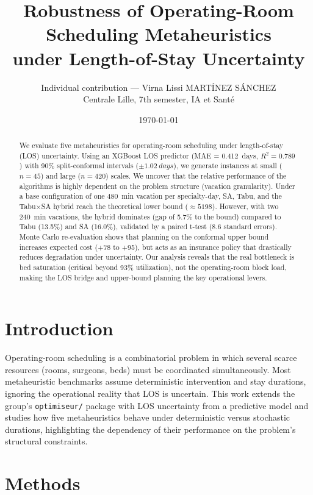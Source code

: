 \documentclass[11pt,a4paper]{article}
\title{Robustness of Operating-Room Scheduling Metaheuristics\\under Length-of-Stay Uncertainty}
\author{Individual contribution --- Virna Lissi MARTÍNEZ SÁNCHEZ\\Centrale Lille, 7th semester, IA et Santé}
\date{\today}
\begin{document}
\maketitle

\begin{abstract}
\noindent
We evaluate five metaheuristics for operating-room scheduling under length-of-stay (LOS) uncertainty. Using an XGBoost LOS predictor (MAE = \SI{0.412}{days}, \(R^2 = 0.789\)) with 90\% split-conformal intervals (\(\pm \SI{1.02}{days}\)), we generate instances at small (\(n=45\)) and large (\(n=420\)) scales. We uncover that the relative performance of the algorithms is highly dependent on the problem structure (vacation granularity). Under a base configuration of one \SI{480}{min} vacation per specialty-day, SA, Tabu, and the Tabu\(\times\)SA hybrid reach the theoretical lower bound (\(\approx 5198\)). However, with two \SI{240}{min} vacations, the hybrid dominates (gap of 5.7\% to the bound) compared to Tabu (13.5\%) and SA (16.0\%), validated by a paired t-test (8.6 standard errors). Monte Carlo re-evaluation shows that planning on the conformal upper bound increases expected cost (+78 to +95), but acts as an insurance policy that drastically reduces degradation under uncertainty. Our analysis reveals that the real bottleneck is bed saturation (critical beyond 93\% utilization), not the operating-room block load, making the LOS bridge and upper-bound planning the key operational levers.
\end{abstract}

\section{Introduction}
Operating-room scheduling is a combinatorial problem in which several scarce resources (rooms, surgeons, beds) must be coordinated simultaneously. Most metaheuristic benchmarks assume deterministic intervention and stay durations, ignoring the operational reality that LOS is uncertain. This work extends the group's \texttt{optimiseur/} package with LOS uncertainty from a predictive model and studies how five metaheuristics behave under deterministic versus stochastic durations, highlighting the dependency of their performance on the problem's structural constraints.

\section{Methods}
\end{document}
